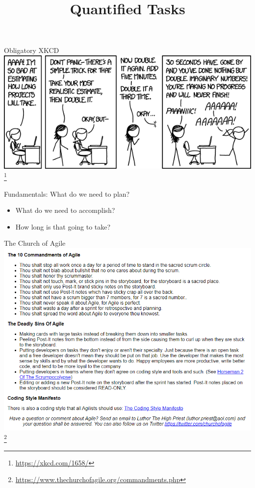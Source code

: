 \documentclass[aspectratio=169]{beamer}
\title{Quantified Tasks}
\institute{Engineers for Exploration, UC San Diego}
\begin{document}
\maketitle
\begin{frame}{Obligatory XKCD}
    \centering
    \includegraphics[width=\textwidth,height=0.7\textheight,keepaspectratio]{16_xkcd_1658.png} \footnote{\url{https://xkcd.com/1658/}}
\end{frame}
\begin{frame}{Fundamentals: What do we need to plan?}
    \begin{itemize}
        \item What do we need to accomplish?
        \item How long is that going to take?
    \end{itemize}
\end{frame}
\begin{frame}{The Church of Agile}
    \centering
    \includegraphics[width=\textwidth,height=0.8\textheight,keepaspectratio]{16_church_of_agile_10_commandments.png} \footnote{\url{https://www.thechurchofagile.org/commandments.php}}
\end{frame}
\end{document}
